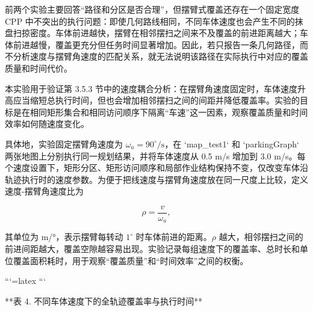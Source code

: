 前两个实验主要回答“路径和分区是否合理”，但摆臂式覆盖还存在一个固定宽度 CPP 中不突出的执行问题：即使几何路线相同，不同车体速度也会产生不同的抹盘扫掠密度。车体前进越快，摆臂在相邻摆扫之间来不及覆盖的前进距离越大；车体前进越慢，覆盖更充分但任务时间显著增加。因此，若只报告一条几何路径，而不分析速度与摆臂角速度的匹配关系，就无法说明该路径在实际执行中对应的覆盖质量和时间代价。

本实验用于验证第 3.5.3 节中的速度耦合分析：在摆臂角速度固定时，车体速度升高应当缩短总执行时间，但也会增加相邻摆扫之间的间距并降低覆盖率。实验的目标是在相同矩形集合和相同访问顺序下隔离“车速”这一因素，观察覆盖质量和时间效率如何随速度变化。

具体地，实验固定摆臂角速度为 $\omega_a=90^\circ/\mathrm{s}$，在 `map_test1` 和 `parkingGraph` 两张地图上分别执行同一规划结果，并将车体速度从 0.5 m/s 增加到 3.0 m/s。每个速度设置下，矩形分区、矩形访问顺序和局部作业结构保持不变，仅改变车体沿轨迹执行时的速度参数。为便于把线速度与摆臂角速度放在同一尺度上比较，定义速度-摆臂角速度比为

  

$$
\rho=\frac{v}{\omega_a},
$$

  

其单位为 m/°，表示摆臂每转动 $1^\circ$ 时车体前进的距离。$\rho$ 越大，相邻摆扫之间的前进间距越大，覆盖空隙越容易出现。实验记录每组速度下的覆盖率、总时长和单位覆盖面积耗时，用于观察“覆盖质量”和“时间效率”之间的权衡。

  

```{=latex}
\newpage
```

**表 4. 不同车体速度下的全轨迹覆盖率与执行时间**

  

